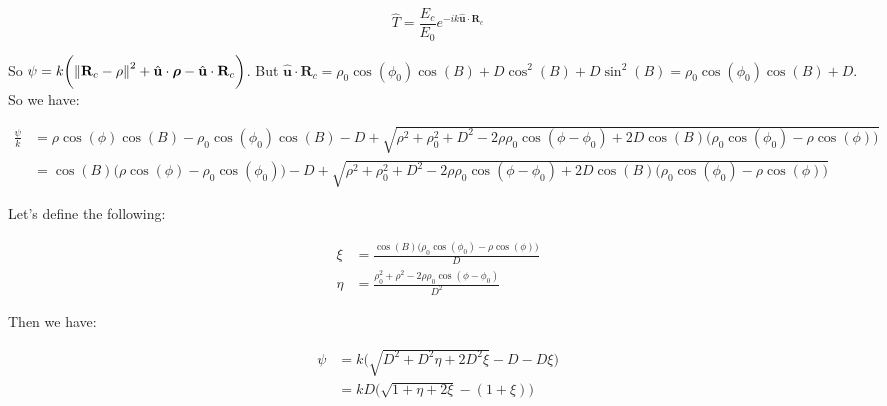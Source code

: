 \documentclass{article}
\theoremstyle{mystyle}
\begin{document}
\begin{equation}
\hat{T} = \frac{E_{c}}{E_{0}}e^{-ik\hat{\mathbf{u}}\cdot\mathbf{R}_{c}}
\end{equation}

\noindent So $\psi = k\bigg(\norm{\mathbf{R}_{c}-\rho}^2 + \hat{\mathbf{u}}\cdot\boldsymbol{\rho} - \hat{\mathbf{u}}\cdot \mathbf{R}_{c}\bigg)$. But $\hat{\mathbf{u}}\cdot \mathbf{R}_{c} = \rho_{0}\cos(\phi_0)\cos(B) + D\cos^2(B) + D\sin^2(B) = \rho_{0}\cos(\phi_0)\cos(B)+D$. So we have:

\begin{align}
\nonumber \frac{\psi}{k} &= \rho\cos(\phi)\cos(B) - \rho_0\cos(\phi_0)\cos(B)-D+\sqrt{\rho^2+\rho_{0}^2 + D^2 - 2\rho\rho_{0}\cos(\phi - \phi_{0}) + 2D\cos(B)\big(\rho_{0}\cos(\phi_0) - \rho\cos(\phi)\big)} \\
&= \cos(B)\big(\rho\cos(\phi) - \rho_{0}\cos(\phi_{0})\big) - D + \sqrt{\rho^2+\rho_{0}^2 + D^2 - 2\rho\rho_{0}\cos(\phi - \phi_{0}) + 2D\cos(B)\big(\rho_{0}\cos(\phi_0) - \rho\cos(\phi)\big)}
\end{align}

Let's define the following:

\begin{align}
\xi &= \frac{\cos(B)\big(\rho_{0}\cos(\phi_{0})-\rho\cos(\phi)\big)}{D} \\
\eta &= \frac{\rho_{0}^2+\rho^2-2\rho\rho_{0}\cos(\phi-\phi_{0})}{D^2}
\end{align}

Then we have:

\begin{align}
\nonumber\psi &= k\big(\sqrt{D^2+D^2\eta + 2D^2\xi}-D-D\xi\big)\\
&= kD\big(\sqrt{1+\eta+2\xi}-(1+\xi)\big)
\end{align}
\end{document}
